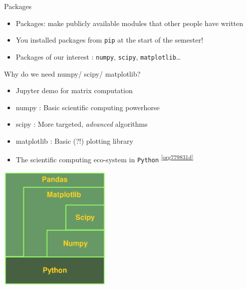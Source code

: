 \documentclass[presentation]{beamer}
\begin{document}
\begin{frame}[label={sec:orge6f0f51},fragile]{Packages}
 \begin{itemize}
\item Packages: make publicly available modules that other people have written
\item You installed packages from \texttt{pip} at the start of the semester!
\item Packages of our interest : \texttt{numpy}, \texttt{scipy}, \texttt{matplotlib}\ldots{}
\end{itemize}
\end{frame}
\begin{frame}[label={sec:org255214f},fragile]{Why do we need numpy/ scipy/ matplotlib?}
 \begin{itemize}
\item \alert{Jupyter demo} for matrix computation
\item \alert{numpy} : Basic scientific computing powerhorse
\item \alert{scipy} : More targeted, \emph{advanced} algorithms
\item \alert{matplotlib} : Basic (?!) plotting library
\item The scientific computing eco-system in \texttt{Python} \textsuperscript{\ref{org779831d}}
\end{itemize}
\begin{center}
\includegraphics[width=0.4\textwidth]{images/python_numerics.png}
\end{center}
\end{frame}

\end{document}

